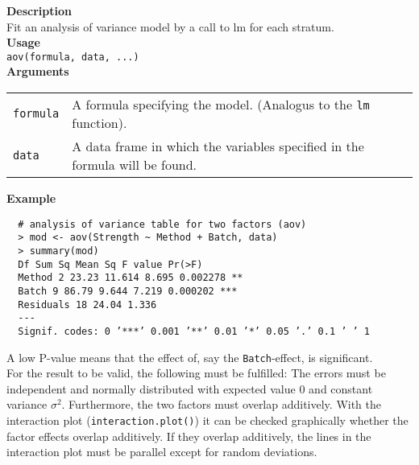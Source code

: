 \textbf{Description}\\
Fit an analysis of variance model by a call to lm for each stratum.\\

\textbf{Usage}\\
\texttt{aov(formula, data, ...)}\\

\textbf{Arguments}\\
\begin{table}[H]
  \scriptsize
  \begin{tabularx}{\linewidth}{lX}
    \texttt{formula} & A formula specifying the model. (Analogus to the \texttt{lm} function).\\
    \texttt{data} & A data frame in which the variables specified in the formula will be found.
  \end{tabularx}
\end{table}

\textbf{Example}\\
\begingroup
\scriptsize
\begin{verbatim}
  # analysis of variance table for two factors (aov)
  > mod <- aov(Strength ~ Method + Batch, data)
  > summary(mod)
  Df Sum Sq Mean Sq F value Pr(>F)
  Method 2 23.23 11.614 8.695 0.002278 **
  Batch 9 86.79 9.644 7.219 0.000202 ***
  Residuals 18 24.04 1.336
  ---
  Signif. codes: 0 ’***’ 0.001 ’**’ 0.01 ’*’ 0.05 ’.’ 0.1 ’ ’ 1

\end{verbatim}
\endgroup
A low P-value means that the effect of, say the \texttt{Batch}-effect, is significant.\\
For the result to be valid, the following must be fulfilled: The errors must be independent and normally distributed with expected value $0$ and constant variance $\sigma^2$. Furthermore, the two factors must overlap additively. With the interaction plot (\texttt{interaction.plot()}) it can be checked graphically whether the factor effects overlap additively. If they overlap additively, the lines in the interaction plot must be parallel except for random deviations.

%

